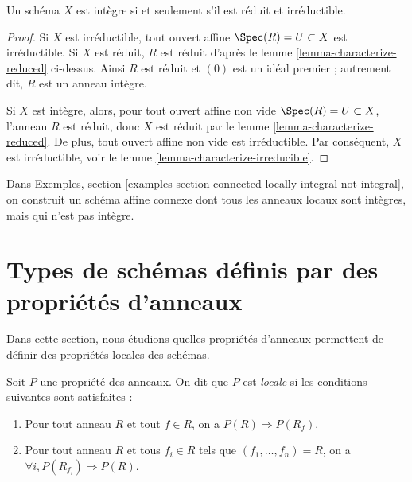 \begin{lemma}
\label{lemma-characterize-integral}
Un schéma $X$ est intègre si et seulement s'il est réduit et irréductible.
\end{lemma}

\begin{proof}
Si $X$ est irréductible, tout ouvert affine $\Spec(R) = U \subset X$
est irréductible. Si $X$ est réduit, $R$ est réduit d'après
le lemme \ref{lemma-characterize-reduced} ci-dessus. Ainsi $R$ est réduit
et $(0)$ est un idéal premier ; autrement dit, $R$ est un anneau intègre.

\medskip\noindent
Si $X$ est intègre, alors, pour tout ouvert affine non vide
$\Spec(R) = U \subset X$, l'anneau $R$ est
réduit, donc $X$ est réduit par le lemme \ref{lemma-characterize-reduced}.
De plus, tout ouvert affine non vide est irréductible. Par
conséquent, $X$ est irréductible, voir le lemme \ref{lemma-characterize-irreducible}.
\end{proof}

\noindent
Dans Exemples, section
\ref{examples-section-connected-locally-integral-not-integral},
on construit un schéma affine connexe dont tous les anneaux locaux sont intègres,
mais qui n'est pas intègre.











\section{Types de schémas définis par des propriétés d'anneaux}
\label{section-properties-rings}

\noindent
Dans cette section, nous étudions quelles propriétés
d'anneaux permettent de définir des propriétés locales des schémas.

\begin{definition}
\label{definition-property-local}
Soit $P$ une propriété des
anneaux. On dit que $P$ est {\it locale} si les conditions suivantes sont satisfaites :
\begin{enumerate}
\item Pour tout anneau $R$ et tout $f \in R$, on a
$P(R) \Rightarrow P(R_f)$.
\item Pour tout anneau $R$ et tous $f_i \in R$ tels que
$(f_1, \ldots, f_n) = R$, on a
$\forall i, P(R_{f_i}) \Rightarrow P(R)$.
\end{enumerate}
\end{definition}

